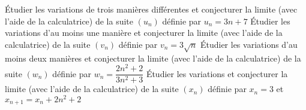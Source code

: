 \documentclass[a4paper, 11pt, oneside]{memoir}
\begin{document}

\setcounter{tocdepth}{3}
\tableofcontents*

\setcounter{chapitre}{6}

\clearpage
\begin{questions}

\exercice Étudier les variations de trois manières différentes et conjecturer la limite (avec l'aide de la calculatrice) de la suite $(u_n)$ définie par $u_n = 3n+7$
\exercice Étudier les variations d'au moins une manière et conjecturer la limite (avec l'aide de la calculatrice) de la suite $(v_n)$ définie par $v_n = 3\sqrt{n}$
\exercice Étudier les variations d'au moins deux manières et conjecturer la limite (avec l'aide de la calculatrice) de la suite $(w_n)$ définie par $w_n = \dfrac{2n^2+2}{3n^2+3}$
\exercice Étudier les variations et conjecturer la limite (avec l'aide de la calculatrice) de la suite $(x_n)$ définie par $x_n = 3$ et $x_{n+1} = x_n + 2n^2+2$


\end{questions}
\end{document}
